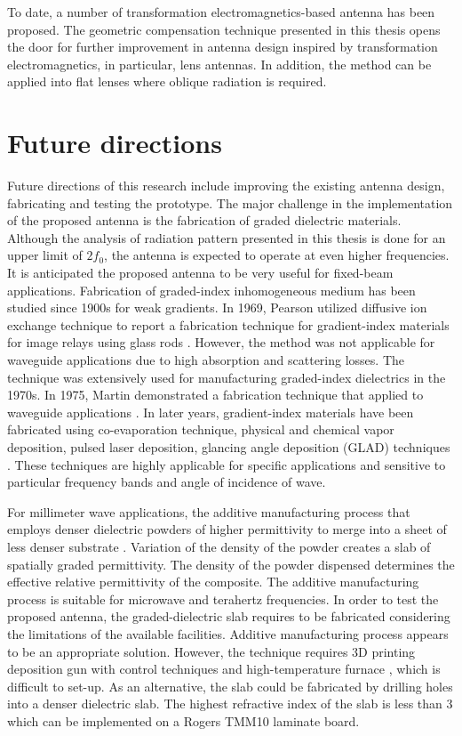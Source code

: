 To date, a number of transformation electromagnetics-based antenna has been proposed. The geometric compensation technique presented in this thesis opens the door for further improvement in antenna design inspired by transformation electromagnetics, in particular, lens antennas.  In addition, the method can be applied into flat lenses where oblique radiation is required. 

\section{Future directions}
Future directions of this research include improving the existing antenna design, fabricating and testing the prototype. The major challenge in the implementation of the proposed antenna is the fabrication of graded dielectric materials. Although the analysis of radiation pattern presented in this thesis is done for an upper limit of $2f_0$, the antenna is expected to operate at even higher frequencies. It is anticipated the proposed antenna to be very useful for fixed-beam applications. Fabrication of graded-index inhomogeneous medium has been studied since 1900s for weak gradients. In 1969, Pearson utilized diffusive ion exchange technique to report a fabrication technique for gradient-index materials for image relays using glass rods \cite{pearson1969}. However, the method was not applicable for waveguide applications due to high absorption and scattering losses. The technique was extensively used for manufacturing graded-index dielectrics in the 1970s. In 1975, Martin demonstrated a fabrication technique that applied to waveguide applications \cite{martin1974}. In later years, gradient-index materials have been fabricated using co-evaporation technique, physical and chemical vapor deposition, pulsed laser deposition, glancing angle deposition (GLAD) techniques \cite{shvartsburg2013}. These techniques are highly applicable for specific applications and sensitive to particular frequency bands and angle of incidence of wave. 

For millimeter wave applications, the additive manufacturing process that employs denser dielectric powders of higher permittivity to merge into a sheet of less denser substrate \cite{Roper2014}. Variation of the density of the powder creates a slab of spatially graded permittivity. The density of the powder dispensed determines the effective relative permittivity of the composite. The additive manufacturing process is suitable for microwave and terahertz frequencies. In order to test the proposed antenna, the graded-dielectric slab requires to be fabricated considering the limitations of the available facilities. Additive manufacturing process appears to be an appropriate solution. However, the technique requires 3D printing deposition gun with control techniques and high-temperature furnace \cite{Roper2014}, which is difficult to set-up. As an alternative, the slab could be fabricated by drilling holes into a denser dielectric slab. The highest refractive index of the slab is less than 3 which can be implemented on a Rogers TMM10 laminate board. 


